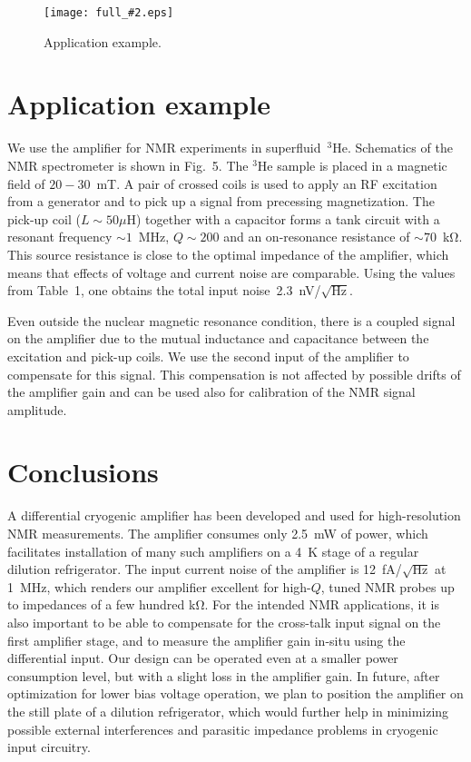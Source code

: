 \documentclass{twocol}
\newcommand{\image}[3]{
\begin{figure}[#1]
\begin{center}
\texttt{[image: full\_\#2.eps]}
\caption{\small#3}
\label{image:#2}
\end{center}
\end{figure}
}
\begin{document}
\image{h}{appl}{Application example.}

\section{Application example}

We use the amplifier for NMR experiments in superfluid~$^3$He. Schematics
of the NMR spectrometer is shown in Fig.~5. The $^3$He sample is placed
in a magnetic field of $20-30$~mT. A pair of crossed coils is used to
apply an RF excitation from a generator and to pick up a signal from
precessing magnetization. The pick-up coil ($L\sim50\mu$H) together with
a capacitor forms a tank circuit with a resonant frequency $\sim 1$~MHz,
$Q \sim 200$ and an on-resonance resistance of $\sim
70$~k$\mathrm{\Omega}$. This source resistance is close to the optimal
impedance of the amplifier, which means that effects of voltage and
current noise are comparable. Using the values from Table~1, one obtains
the total input noise~2.3~nV/$\sqrt{\mbox{Hz}}$.

Even outside the nuclear magnetic resonance condition, there is a coupled
signal on the amplifier due to the mutual inductance and capacitance
between the excitation and pick-up coils. We use the second input of the
amplifier to compensate for this signal. This compensation is not
affected by possible drifts of the amplifier gain and can be used also
for calibration of the NMR signal amplitude.

\section{Conclusions}

A differential cryogenic amplifier has been developed and used for
high-resolution NMR measurements. The amplifier consumes only 2.5~mW of
power, which facilitates installation of many such amplifiers on a 4~K
stage of a regular dilution refrigerator. The input current noise of the
amplifier is 12~fA/$\sqrt{\mbox{Hz}}$ at 1~MHz, which renders our
amplifier excellent for high-$Q$, tuned NMR probes up to impedances of a
few hundred k$\mathrm{\Omega}$.  For the intended NMR applications, it is also
important to be able to compensate for the cross-talk input signal on the
first amplifier stage, and to measure the amplifier gain in-situ using
the differential input. Our design can be operated even at a smaller
power consumption level, but with a slight loss in the amplifier gain. In
future, after optimization for lower bias voltage operation, we plan to
position the amplifier on the still plate of a
dilution refrigerator, which would further help in minimizing possible
external interferences and parasitic impedance problems in cryogenic
input circuitry.
\end{document}
